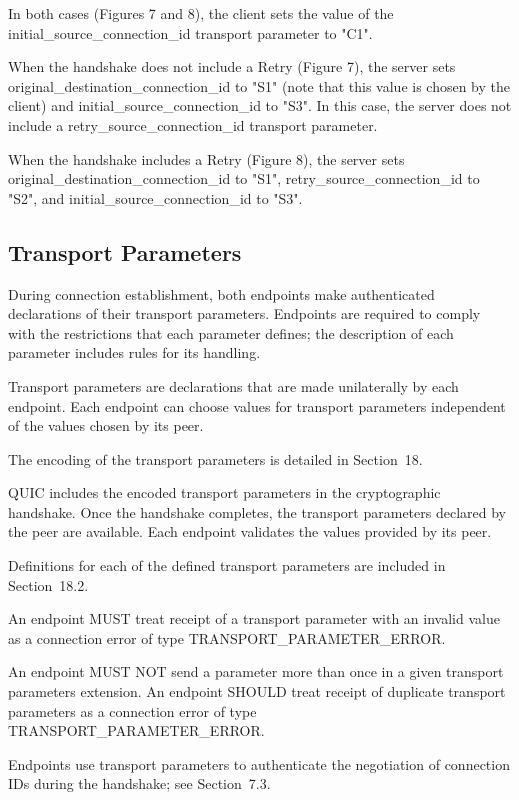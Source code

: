 \documentclass{article}
\begin{document}
In both cases (Figures 7 and 8), the client sets the value of the initial\_source\_connection\_id transport parameter to "C1".

When the handshake does not include a Retry (Figure 7), the server sets original\_destination\_connection\_id to "S1" (note that this value is chosen by the client) and initial\_source\_connection\_id to "S3". In this case, the server does not include a retry\_source\_connection\_id transport parameter.

When the handshake includes a Retry (Figure 8), the server sets original\_destination\_connection\_id to "S1", retry\_source\_connection\_id to "S2", and initial\_source\_connection\_id to "S3".

\subsection{Transport Parameters}

During connection establishment, both endpoints make authenticated declarations of their transport parameters.  Endpoints are required to comply with the restrictions that each parameter defines; the description of each parameter includes rules for its handling.

Transport parameters are declarations that are made unilaterally by each endpoint.  Each endpoint can choose values for transport parameters independent of the values chosen by its peer.

The encoding of the transport parameters is detailed in Section~18.

QUIC includes the encoded transport parameters in the cryptographic handshake.  Once the handshake completes, the transport parameters declared by the peer are available.  Each endpoint validates the values provided by its peer.

Definitions for each of the defined transport parameters are included in Section~18.2.

An endpoint MUST treat receipt of a transport parameter with an invalid value as a connection error of type TRANSPORT\_PARAMETER\_ERROR.

An endpoint MUST NOT send a parameter more than once in a given transport parameters extension.  An endpoint SHOULD treat receipt of duplicate transport parameters as a connection error of type TRANSPORT\_PARAMETER\_ERROR.

Endpoints use transport parameters to authenticate the negotiation of connection IDs during the handshake; see Section~7.3.
\end{document}
